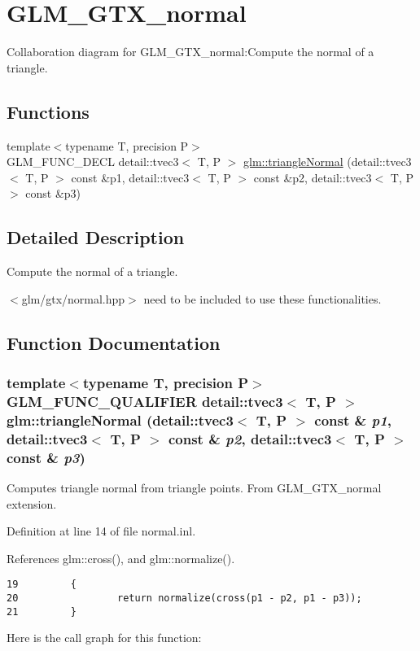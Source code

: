 \hypertarget{group__gtx__normal}{
\section{GLM\_\-GTX\_\-normal}
\label{group__gtx__normal}
}


Collaboration diagram for GLM\_\-GTX\_\-normal:Compute the normal of a triangle.  
\subsection*{Functions}
\begin{CompactItemize}
\item 
{\footnotesize template$<$typename T, precision P$>$ }\\GLM\_\-FUNC\_\-DECL detail::tvec3$<$ T, P $>$ \hyperlink{group__gtx__normal_g008775be02f71e8673a58e34acbb9a69}{glm::triangleNormal} (detail::tvec3$<$ T, P $>$ const \&p1, detail::tvec3$<$ T, P $>$ const \&p2, detail::tvec3$<$ T, P $>$ const \&p3)
\end{CompactItemize}


\subsection{Detailed Description}
Compute the normal of a triangle. 

$<$glm/gtx/normal.hpp$>$ need to be included to use these functionalities. 

\subsection{Function Documentation}
\hypertarget{group__gtx__normal_g008775be02f71e8673a58e34acbb9a69}{
\subsubsection[triangleNormal]{\setlength{\rightskip}{0pt plus 5cm}template$<$typename T, precision P$>$ GLM\_\-FUNC\_\-QUALIFIER detail::tvec3$<$ T, P $>$ glm::triangleNormal (detail::tvec3$<$ T, P $>$ const \& {\em p1}, \/  detail::tvec3$<$ T, P $>$ const \& {\em p2}, \/  detail::tvec3$<$ T, P $>$ const \& {\em p3})}}
\label{group__gtx__normal_g008775be02f71e8673a58e34acbb9a69}


Computes triangle normal from triangle points. From GLM\_\-GTX\_\-normal extension. 

Definition at line 14 of file normal.inl.

References glm::cross(), and glm::normalize().

\begin{Code}\begin{verbatim}19         {
20                 return normalize(cross(p1 - p2, p1 - p3));
21         }
\end{verbatim}
\end{Code}




Here is the call graph for this function: